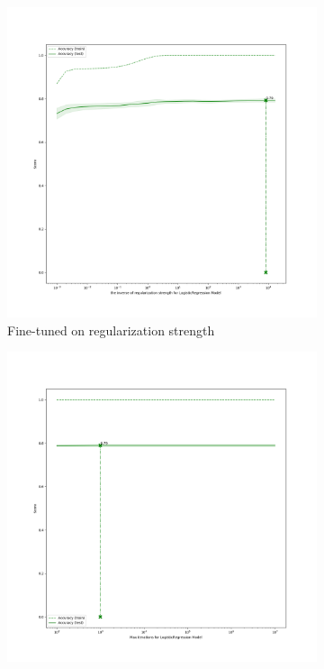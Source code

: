 \begin{figure}[!ht]
    \centering
    \begin{subfigure}[]{0.225\textwidth}
        \centering
        \includegraphics[width=\textwidth]{files/figs/finetuneC.png}
        \caption[]%
        {{\small Fine-tuned on regularization strength}}    
        \label{fig:numberofwords}
    \end{subfigure}
    \begin{subfigure}[]{0.225\textwidth}  
        \centering 
        \includegraphics[width=\textwidth]{files/figs/finetuneIterations.png}

\end{subfigure}
\end{figure}
